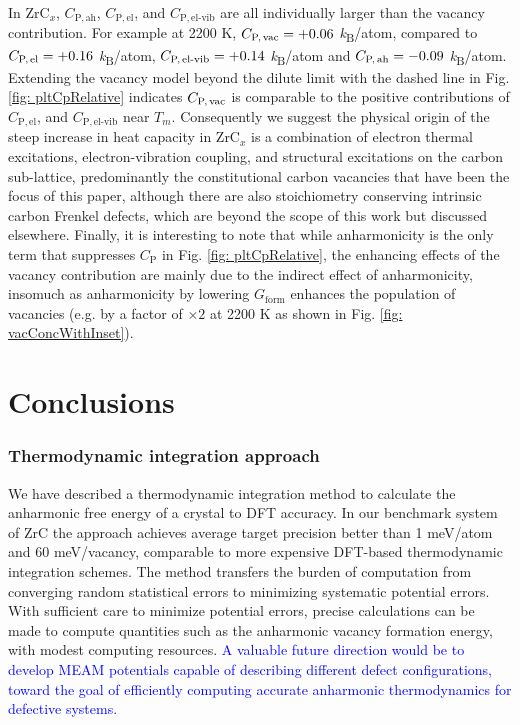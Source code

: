 \documentclass[twocolumn,american,aps,prb,showpacs,showkeys,amsmath,amssymb,superscriptaddress,a4]{revtex4-1}
\begin{document}
In ZrC$_x$, $C_{\text{P},\,\text{ah}}$, $C_{\text{P},\,\text{el}}$, and $C_{\text{P},\,\text{el-vib}}$
are all individually larger than the vacancy contribution. For example at 2200 K, $ C_{\text{P,\,vac}}=+0.06$ \emph{k}\textsubscript{B}/atom,
compared to $ C_{\text{P,\,el}}=+0.16$ \emph{k}\textsubscript{B}/atom, $C_{\text{P,\,el-vib}}=+0.14$ \emph{k}\textsubscript{B}/atom 
and $C_{\text{P,\,ah}}=-0.09$ \emph{k}\textsubscript{B}/atom. Extending the vacancy model  beyond the dilute limit with the dashed line in Fig. \ref{fig: pltCpRelative} indicates $C_{\text{P,\,vac}}$ is comparable to the positive contributions of $C_{\text{P},\,\text{el}}$, and $C_{\text{P},\,\text{el-vib}}$ near $T_m$.  Consequently we suggest the physical origin of the steep increase in heat capacity in ZrC$_x$\cite{Savvatimskiy2017} is a combination of electron thermal excitations, electron-vibration coupling, and structural excitations on the carbon sub-lattice, predominantly the constitutional carbon vacancies that have been the focus of this paper, although there are also stoichiometry conserving intrinsic carbon Frenkel defects, which are beyond the scope of this work but discussed elsewhere.\cite{Mellan2018,Savvatimskiy2017} Finally, it is interesting to note that while anharmonicity is the only term that suppresses $C_\text{P}$ in Fig. \ref{fig: pltCpRelative}, the enhancing  effects of the vacancy contribution are mainly due to the indirect effect of anharmonicity, insomuch as anharmonicity by lowering $G_\text{form}$ enhances the population of vacancies (e.g. by a factor of $\times2$ at 2200 K  as shown in Fig. \ref{fig: vacConcWithInset}).


\section{Conclusions}

\subsubsection*{Thermodynamic integration approach}

We have described a thermodynamic integration method to calculate
the anharmonic free energy of a crystal to DFT accuracy. In our benchmark system of ZrC the approach achieves average target
precision better than 1 meV/atom and 60 meV/vacancy, comparable to more expensive
DFT-based thermodynamic integration schemes. The method transfers
the burden of computation from converging random statistical errors
to minimizing systematic potential errors. With sufficient care to
minimize potential errors, precise calculations can be made to compute
quantities such as the anharmonic vacancy formation energy, with modest
computing resources. \textcolor{blue}{A valuable future direction would be to develop  MEAM potentials capable of describing different defect configurations, toward the goal of efficiently computing accurate anharmonic thermodynamics for defective systems.}
\end{document}
